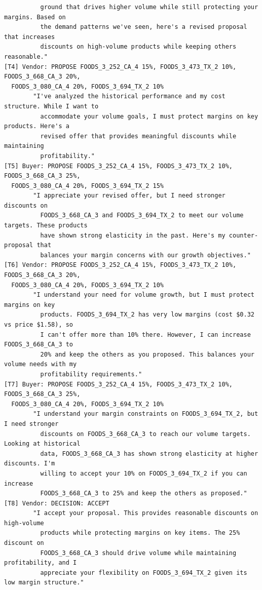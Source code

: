 {\begin{verbatim}
          ground that drives higher volume while still protecting your margins. Based on
          the demand patterns we've seen, here's a revised proposal that increases
          discounts on high-volume products while keeping others reasonable."
[T4] Vendor: PROPOSE FOODS_3_252_CA_4 15%, FOODS_3_473_TX_2 10%, FOODS_3_668_CA_3 20%,
  FOODS_3_080_CA_4 20%, FOODS_3_694_TX_2 10%
        "I've analyzed the historical performance and my cost structure. While I want to
          accommodate your volume goals, I must protect margins on key products. Here's a
          revised offer that provides meaningful discounts while maintaining
          profitability."
[T5] Buyer: PROPOSE FOODS_3_252_CA_4 15%, FOODS_3_473_TX_2 10%, FOODS_3_668_CA_3 25%,
  FOODS_3_080_CA_4 20%, FOODS_3_694_TX_2 15%
        "I appreciate your revised offer, but I need stronger discounts on
          FOODS_3_668_CA_3 and FOODS_3_694_TX_2 to meet our volume targets. These products
          have shown strong elasticity in the past. Here's my counter-proposal that
          balances your margin concerns with our growth objectives."
[T6] Vendor: PROPOSE FOODS_3_252_CA_4 15%, FOODS_3_473_TX_2 10%, FOODS_3_668_CA_3 20%,
  FOODS_3_080_CA_4 20%, FOODS_3_694_TX_2 10%
        "I understand your need for volume growth, but I must protect margins on key
          products. FOODS_3_694_TX_2 has very low margins (cost $0.32 vs price $1.58), so
          I can't offer more than 10% there. However, I can increase FOODS_3_668_CA_3 to
          20% and keep the others as you proposed. This balances your volume needs with my
          profitability requirements."
[T7] Buyer: PROPOSE FOODS_3_252_CA_4 15%, FOODS_3_473_TX_2 10%, FOODS_3_668_CA_3 25%,
  FOODS_3_080_CA_4 20%, FOODS_3_694_TX_2 10%
        "I understand your margin constraints on FOODS_3_694_TX_2, but I need stronger
          discounts on FOODS_3_668_CA_3 to reach our volume targets. Looking at historical
          data, FOODS_3_668_CA_3 has shown strong elasticity at higher discounts. I'm
          willing to accept your 10% on FOODS_3_694_TX_2 if you can increase
          FOODS_3_668_CA_3 to 25% and keep the others as proposed."
[T8] Vendor: DECISION: ACCEPT
        "I accept your proposal. This provides reasonable discounts on high-volume
          products while protecting margins on key items. The 25% discount on
          FOODS_3_668_CA_3 should drive volume while maintaining profitability, and I
          appreciate your flexibility on FOODS_3_694_TX_2 given its low margin structure."
\end{verbatim}
}

